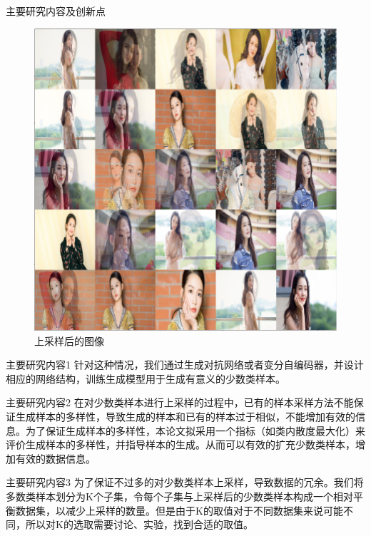 \documentclass{beamer}
\begin{document}
\begin{frame}{主要研究内容及创新点}\pause
    \begin{figure}[t]
        \includegraphics[scale=0.25]{liSMOTE2.png}
        \caption{上采样后的图像}
    \end{figure}
\end{frame}

\begin{frame}{主要研究内容1}\pause
    针对这种情况，我们通过生成对抗网络或者变分自编码器，并设计相应的网络结构，训练生成模型用于生成有意义的少数类样本。
\end{frame}

\begin{frame}{主要研究内容2}\pause
    在对少数类样本进行上采样的过程中，已有的样本采样方法不能保证生成样本的多样性，导致生成的样本和已有的样本过于相似，不能增加有效的信息。为了保证生成样本的多样性，本论文拟采用一个指标（如类内散度最大化）来评价生成样本的多样性，并指导样本的生成。从而可以有效的扩充少数类样本，增加有效的数据信息。
\end{frame}

\begin{frame}{主要研究内容3}\pause
    为了保证不过多的对少数类样本上采样，导致数据的冗余。我们将多数类样本划分为K个子集，令每个子集与上采样后的少数类样本构成一个相对平衡数据集，以减少上采样的数量。但是由于K的取值对于不同数据集来说可能不同，所以对K的选取需要讨论、实验，找到合适的取值。
\end{frame}
\end{document}
